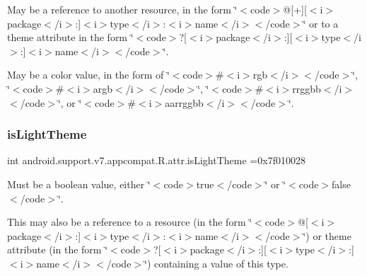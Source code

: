 May be a reference to another resource, in the form \char`\"{}$<$code$>$@\mbox{[}+\mbox{]}\mbox{[}$<$i$>$package$<$/i$>$\+:\mbox{]}$<$i$>$type$<$/i$>$\+:$<$i$>$name$<$/i$>$$<$/code$>$\char`\"{} or to a theme attribute in the form \char`\"{}$<$code$>$?\mbox{[}$<$i$>$package$<$/i$>$\+:\mbox{]}\mbox{[}$<$i$>$type$<$/i$>$\+:\mbox{]}$<$i$>$name$<$/i$>$$<$/code$>$\char`\"{}. 

May be a color value, in the form of \char`\"{}$<$code$>$\#$<$i$>$rgb$<$/i$>$$<$/code$>$\char`\"{}, \char`\"{}$<$code$>$\#$<$i$>$argb$<$/i$>$$<$/code$>$\char`\"{}, \char`\"{}$<$code$>$\#$<$i$>$rrggbb$<$/i$>$$<$/code$>$\char`\"{}, or \char`\"{}$<$code$>$\#$<$i$>$aarrggbb$<$/i$>$$<$/code$>$\char`\"{}. \mbox{\label{classandroid_1_1support_1_1v7_1_1appcompat_1_1R_1_1attr_aa9f7641035ef1504e26fcecdfae556ab}} 
\subsubsection{\texorpdfstring{is\+Light\+Theme}{isLightTheme}}
{\footnotesize\ttfamily int android.\+support.\+v7.\+appcompat.\+R.\+attr.\+is\+Light\+Theme =0x7f010028\hspace{0.3cm}{\ttfamily [static]}}

Must be a boolean value, either \char`\"{}$<$code$>$true$<$/code$>$\char`\"{} or \char`\"{}$<$code$>$false$<$/code$>$\char`\"{}. 

This may also be a reference to a resource (in the form \char`\"{}$<$code$>$@\mbox{[}$<$i$>$package$<$/i$>$\+:\mbox{]}$<$i$>$type$<$/i$>$\+:$<$i$>$name$<$/i$>$$<$/code$>$\char`\"{}) or theme attribute (in the form \char`\"{}$<$code$>$?\mbox{[}$<$i$>$package$<$/i$>$\+:\mbox{]}\mbox{[}$<$i$>$type$<$/i$>$\+:\mbox{]}$<$i$>$name$<$/i$>$$<$/code$>$\char`\"{}) containing a value of this type. \mbox{\label{classandroid_1_1support_1_1v7_1_1appcompat_1_1R_1_1attr_af3d58ae96a7287454829f832ccdea6eb}} 
